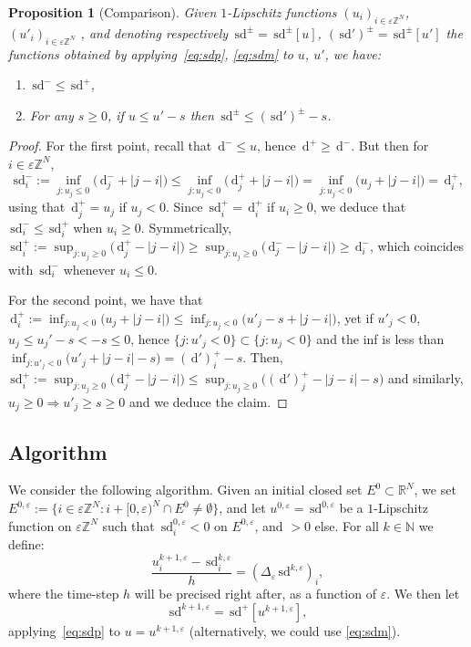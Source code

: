 \documentclass[10pt]{amsart}
\theoremstyle{plain}
\newtheorem{proposition}[theorem]{Proposition}
\theoremstyle{definition}
\newcommand{\R}{\mathbb{R}}
\newcommand{\Z}{\mathbb{Z}}
\newcommand{\N}{\mathbb{N}}
\newcommand{\e}{\varepsilon}
\newcommand{\ud}{\,\mathrm{d}}
\newcommand{\sd}{\,\mathrm{sd}}
\newcommand{\ez}{\e\Z^N}
\numberwithin{equation}{section}
\begin{document}
\begin{proposition}[Comparison]
  Given $1$-Lipschitz functions  $(u_i)_{i\in\ez}$, $(u'_i)_{i\in \ez}$ ,
  and denoting respectively
  $\sd^\pm = \sd^\pm[u]$, $(\sd')^\pm=\sd^\pm[u']$
  the functions obtained by applying~\eqref{eq:sdp}, \eqref{eq:sdm}  to $u$, $u'$, we have:
  \begin{enumerate}
  \item $\sd^-\le \sd^+$,
  \item For any $s\ge 0$, if $u\le u'-s$ then $\sd^\pm \le (\sd')^\pm-s$.
  \end{enumerate}
\end{proposition}
\begin{proof}
  For the first point, recall that  $\ud^- \le u$, hence   $\ud^+ \ge \ud^-$. But then for
  $i\in\ez$,
  \[
    \sd^-_i :=
    \inf_{j:u_j\le 0}  {(}  \ud^-_j + |j-i|  {)}
    \le \inf_{j:u_j< 0}  {(}\ud^+_j + |j-i|  {)}
    = \inf_{j:u_j < 0}  {(} u_j + |j-i|  {)} =  \ud^+_i,
  \]
  using that $\ud^+_j=u_j$ if $u_j<0$.
  Since $\sd^+_i=\ud^+_i$ if $u_i\ge 0$,
  we deduce that $\sd^-_i\le \sd^+_i$ when $u_i\ge 0$. Symmetrically, $ 
  \sd^+_i := \sup_{j:u_j\ge 0}  {(} \ud^+_j - |j-i|  {)} \ge  \sup_{j:u_j\ge 0}  {(} \ud^-_j - |j-i|  {)} \ge \ud^-_i$, 
  which coincides with $\sd^-_i$ whenever $u_i\le 0$.

  For the second point,
  we have that $\ud^+_i := \inf_{j:u_j<0}  {(} u_j + |j-i|  {)} \le \inf_{j:u_j<0}  {(} u'_j-s + |j-i|  {)}$,
  yet if $u'_j<0$, $u_j\le u_j'-s< -s\le 0$, hence $\{j:u'_j<0\}\subset \{j:u_j<0\}$
  and the inf is less than $\inf_{j:u'_j<0}  {(} u'_j + |j-i|-s  {)}= (\ud')^+_i-s$.
  Then, 
  $\sd^+_i := \sup_{j:u_j\ge 0}  {(} \ud^+_j - |j-i|  {)} \le\sup_{j:u_j\ge 0}  {(} (\ud')^+_j - |j-i|-s  {)} $
  and similarly, $u_j\ge 0\Rightarrow u'_j\ge s\ge 0$ and we deduce the claim.
\end{proof}


\subsection{Algorithm}
\label{sec:algo_explheat}
We consider the following algorithm.
Given an initial closed set $E^0\subset\R^N$, we set $E^{0,\e}:=\{i\in\ez: i+[0,\e)^N\cap  E^0\neq \emptyset\}$, and let $u^{0,\e}=\sd^{0,\e}$ be a $1$-Lipschitz function
on $\ez$ such that $\sd^{0,\e}_i < 0$  on $E^{0,\e}$, and $>0$ else. For all $k\in\N$ we define:
\begin{equation}\label{eq:heat}
  \frac{u_i^{k+1,\e}-\sd_i^{k,\e}}{h} = (\Delta_\e \sd^{k,\e})_i,
\end{equation}
where the time-step $h$ will be precised right after, as a function of $\e$.
We then  let
\begin{equation}\label{eq:redistance}
  \sd^{k+1,\e} = \sd^+[u^{k+1,\e}],
\end{equation}
applying~\eqref{eq:sdp} to $u=u^{k+1,\e}$ (alternatively, we could use \eqref{eq:sdm}).
\end{document}
